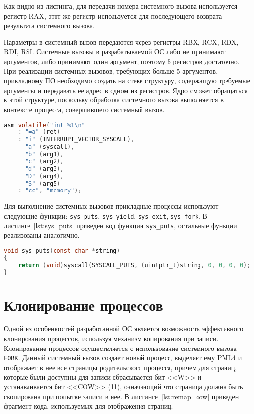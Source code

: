 Как видно из листинга, для передачи номера
системного вызова используется регистр RAX, этот же регистр используется
для последующего возврата результата системного вызова.

Параметры в системный вызов передаются через регистры RBX, RCX, RDX, RDI, RSI.
Системные вызовы в разрабатываемой ОС либо не принимают аргументов, либо принимают один
аргумент, поэтому 5 регистров достаточно. При реализации системных вызовов,
требующих больше 5 аргументов, прикладному ПО необходимо создать на стеке
структуру, содержащую требуемые аргументы и передавать ее адрес в одном из регистров.
Ядро сможет обращаться к этой структуре, поскольку обработка системного вызова
выполняется в контексте процесса, совершившего системный вызов.

\begin{lstlisting}[language=C,
caption={Выполнение системных вызовов},
label={lst:syscall}]
asm volatile("int %1\n"
	: "=a" (ret)
	: "i" (INTERRUPT_VECTOR_SYSCALL),
	  "a" (syscall),
	  "b" (arg1),
	  "c" (arg2),
	  "d" (arg3),
	  "D" (arg4),
	  "S" (arg5)
	: "cc", "memory");
\end{lstlisting}

Для выполнение системных вызовов прикладные процессы используют следующие функции:
\texttt{sys\_puts}, \texttt{sys\_yield}, \texttt{sys\_exit}, \texttt{sys\_fork}. В
листинге~\ref{lst:sys_puts} приведен код функции \texttt{sys\_puts}, остальные функции
реализованы аналогично.

\begin{lstlisting}[language=C, caption={Реализация функции \texttt{sys\_puts}}, label={lst:sys_puts}]
void sys_puts(const char *string)
{
	return (void)syscall(SYSCALL_PUTS, (uintptr_t)string, 0, 0, 0, 0);
}
\end{lstlisting}


\section{Клонирование процессов}
Одной из особенностей разработанной ОС является возможность эффективного клонирования
процессов, используя механизм копирования при записи. Клонирование процессов
осуществляется с использование системного вызова \texttt{FORK}. Данный системный
вызов создает новый процесс, выделяет ему PML4 и отображает в нее все страницы
родительского процесса, причем для страниц, которые были доступны для записи сбрасывается
бит <<W>> и устанавливается бит <<COW>> (11), означающий что страница должна быть
скопирована при попытке записи в нее. В листинге~\ref{lst:remap_cow} приведен фрагмент кода,
используемых для отображения страниц.

